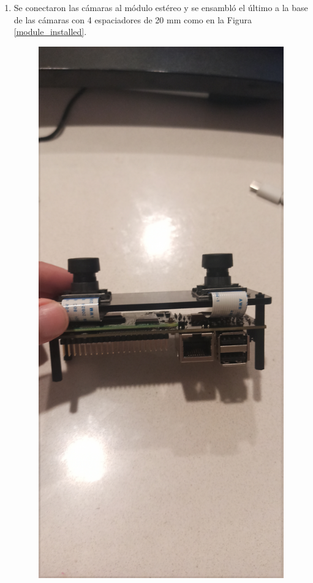 \begin{enumerate}
    \item Se conectaron las cámaras al módulo estéreo y se ensambló el último a la base de las cámaras con 4 espaciadores de 20 mm como en la Figura \ref{module_installed}.
    \begin{figure}[H]
        \centering
        \includegraphics[scale=0.05]{Recursos/module_installed.jpg}

\end{figure}
\end{enumerate}
